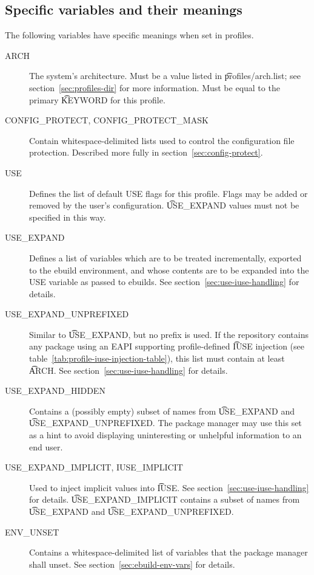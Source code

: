 \subsection{Specific variables and their meanings}
The following variables have specific meanings when set in profiles.
\begin{description}
\item[ARCH] The system's architecture. Must be a value listed in \t{profiles/arch.list}; see
    section~\ref{sec:profiles-dir} for more information. Must be equal to the primary \t{KEYWORD}
    for this profile.
\item[CONFIG_PROTECT, CONFIG_PROTECT_MASK] Contain whitespace-delimited lists used to control the
    configuration file protection. Described more fully in section~\ref{sec:config-protect}.
\item[USE] Defines the list of default USE flags for this profile. Flags may be added or removed by
    the user's configuration. \t{USE_EXPAND} values must not be specified in this way.
\item[USE_EXPAND] Defines a list of variables which are to be treated incrementally, exported to
    the ebuild environment, and whose contents are to be expanded into the USE variable as passed
    to ebuilds. See section~\ref{sec:use-iuse-handling} for details.
\item[USE_EXPAND_UNPREFIXED] Similar to \t{USE_EXPAND}, but no prefix is used. If the repository
    contains any package using an EAPI supporting profile-defined \t{IUSE} injection (see
    table~\ref{tab:profile-iuse-injection-table}), this list must contain at least \t{ARCH}\@.
    See section~\ref{sec:use-iuse-handling} for details.
\item[USE_EXPAND_HIDDEN] Contains a (possibly empty) subset of names from \t{USE_EXPAND} and
    \t{USE_EXPAND_UNPREFIXED}\@. The package manager may use this set as a hint to avoid
    displaying uninteresting or unhelpful information to an end user.
\item[USE_EXPAND_IMPLICIT, IUSE_IMPLICIT] Used to inject implicit values into \t{IUSE}\@.
    See section~\ref{sec:use-iuse-handling} for details. \t{USE_EXPAND_IMPLICIT} contains a subset
    of names from \t{USE_EXPAND} and \t{USE_EXPAND_UNPREFIXED}.
\item[ENV_UNSET] Contains a whitespace-delimited list of variables that the package manager shall
    unset. See section~\ref{sec:ebuild-env-vars} for details.
\end{description}

